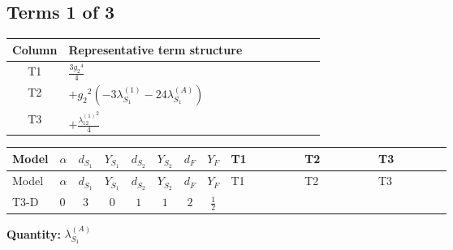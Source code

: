 \documentclass[8pt]{article}
\begin{document}
\begin{landscape}
\subsection*{Terms 1 of 3}
\begin{center}
\begin{tabular}{@{}c >{\raggedright\arraybackslash}p{0.82\linewidth}@{}}
\toprule
Column & Representative term structure \\
\midrule
T1 & \(\displaystyle \frac{3 {g_2}^4}{4}\) \\
\midrule
T2 & \(\displaystyle +{g_2}^2 (-3 {\lambda_{S_1}^{(1)}}-24 {\lambda_{S_1}^{(A)}})\) \\
\midrule
T3 & \(\displaystyle +\frac{{\lambda_{12}^{(1)}}^2}{4}\) \\
\midrule
\bottomrule
\end{tabular}
\end{center}
\smallskip
\tiny
\begin{longtable}{@{}llcccccc >{\raggedright\arraybackslash}p{0.21\linewidth} >{\raggedright\arraybackslash}p{0.21\linewidth} >{\raggedright\arraybackslash}p{0.21\linewidth}@{}}
\toprule
Model & $\alpha$ & $d_{S_1}$ & $Y_{S_1}$ & $d_{S_2}$ & $Y_{S_2}$ & $d_F$ & $Y_F$ & T1 & T2 & T3 \\
\midrule
\endfirsthead
\toprule
Model & $\alpha$ & $d_{S_1}$ & $Y_{S_1}$ & $d_{S_2}$ & $Y_{S_2}$ & $d_F$ & $Y_F$ & T1 & T2 & T3 \\
\midrule
\endhead
T3-D & $0$ & $3$ & $0$ & $1$ & $1$ & $2$ & $\frac{1}{2}$ & \scriptsize\adjustbox{max width=\linewidth}{$\begin{gathered} \frac{3 {g_2}^4}{4}\end{gathered}$} & \scriptsize\adjustbox{max width=\linewidth}{$\begin{gathered} +{g_2}^2 (-3 {\lambda_{S_1}^{(1)}}-24 {\lambda_{S_1}^{(A)}})\end{gathered}$} & \scriptsize\adjustbox{max width=\linewidth}{$\begin{gathered} +\frac{{\lambda_{12}^{(1)}}^2}{4}\end{gathered}$} \\
\midrule
\bottomrule
\end{longtable}
\clearpage
\noindent\textbf{Quantity: }$\lambda_{S_1}^{(A)}$\par\smallskip

\end{landscape}
\end{document}
